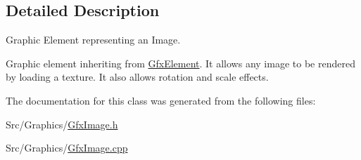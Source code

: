 \subsection{Detailed Description}
Graphic Element representing an Image. 

Graphic element inheriting from \hyperlink{classGfxElement}{Gfx\-Element}. It allows any image to be rendered by loading a texture. It also allows rotation and scale effects. 

The documentation for this class was generated from the following files\-:\begin{DoxyCompactItemize}
\item 
Src/\-Graphics/\hyperlink{GfxImage_8h}{Gfx\-Image.\-h}\item 
Src/\-Graphics/\hyperlink{GfxImage_8cpp}{Gfx\-Image.\-cpp}\end{DoxyCompactItemize}

